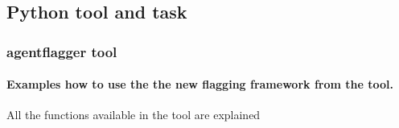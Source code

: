 


\subsection{Python tool and task}

\subsubsection{agentflagger tool}
\paragraph{Examples how to use the the new flagging framework from the tool.}
All the functions available in the tool are explained

